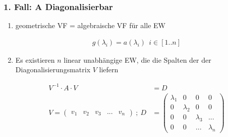 \documentclass[10pt,a4paper]{article}
\begin{document}
\subsubsection{1. Fall: A Diagonalisierbar}
\begin{enumerate}[{(1)}]
    \item geometrische VF = algebraische VF für alle EW
  \begin{mdframed}[style=exercise]
    \begin{align}
        g(\lambda_i) = a(\lambda_i) \ \ i \in [1..n]
    \end{align}
  \end{mdframed}
    \item Es existieren $n$ linear unabhängige EW, die die Spalten der
        der Diagonalisierungsmatrix $V$ liefern
  \begin{mdframed}[style=exercise]
    \begin{align}
        V^{-1} \cdot A \cdot V &= D \\
        V =
        \begin{pmatrix}
            v_1 & v_2 & v_3 & ... & v_n
        \end{pmatrix}\ ;\ 
        D &=
        \begin{pmatrix}
            \lambda_1& 0    & 0  & 0 \\
             0  & \lambda_2  & 0 & 0 \\
             0 & 0 &\lambda_3& ... \\
             0 & 0& ... & \lambda_n 
        \end{pmatrix}
    \end{align}
  \end{mdframed}
\end{enumerate}
\end{document}
